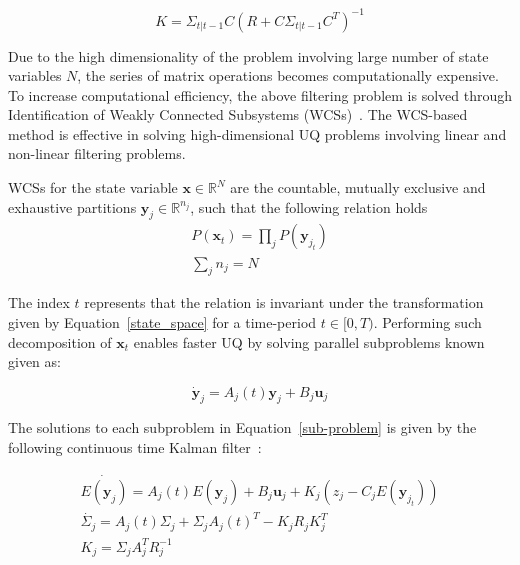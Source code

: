 \begin{equation}
K = \Sigma_{t|t-1} C \left( R + C \Sigma_{t|t-1} C^T \right) ^{-1}
\end{equation}

Due to the high dimensionality of the problem involving large number of state variables $N$, the series of matrix operations becomes computationally expensive. To increase computational efficiency, the above filtering problem is solved through Identification of Weakly Connected Subsystems (WCSs)~\citep{Mukherjee_2017,mukherjee2015laplacian,mukherjee2015non}. The WCS-based method is effective in solving high-dimensional UQ problems involving linear and non-linear filtering problems. %

WCSs for the state variable $\textbf{x} \in \mathbb{R}^N$ are the countable, mutually exclusive and exhaustive partitions $\textbf{y}_j  \in \mathbb{R}^{n_j}$, such that the following relation holds 
\begin{equation}
\begin{array}{l}
\displaystyle P(\textbf{x}_t) = \prod_j P(\textbf{y}_{j_t}) \\ 
\sum_j n_j = N
\end{array}
\end{equation}

The index $t$ represents that the relation is invariant under the transformation given by Equation~\ref{state_space} for a time-period $t \in [0, T)$. Performing such decomposition of $\textbf{x}_t$ enables faster UQ by solving parallel subproblems known given as:

\begin{equation}
\label{sub-problem}
\dot{\textbf{y}}_{j} = A_j(t)\textbf{y}_{j} + B_j \textbf{u}_j
\end{equation}

The solutions to each subproblem in Equation~\ref{sub-problem} is given by the following continuous time Kalman filter~\citep{jazwinski2007stochastic}:

\begin{equation}
\begin{array}{l}
\displaystyle \dot{E(\textbf{y}_{j})} = A_j(t)E(\textbf{y}_{j}) + B_j \textbf{u}_j + K_j(z_j - C_j E(\textbf{y}_{j_t})) \\
\displaystyle \dot{\Sigma_j} = A_j(t)\Sigma_j + \Sigma_j A_j(t)^T - K_j R_j K_j^T \\
\displaystyle K_j = \Sigma_j A_j^T R_j^{-1}
\end{array}
\end{equation}

